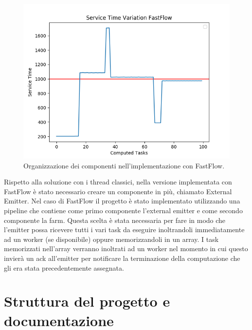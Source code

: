 \documentclass[12pt]{report}
\begin{document}
\begin{figure}[H]
\centering
  \includegraphics[width=0.7\linewidth]{FastFlow.png}
  \caption{Organizzazione dei componenti nell'implementazione con FastFlow.}
  \label{FastFlowComponents}
\end{figure} 
Rispetto alla soluzione con i thread classici, nella versione implementata con FastFlow è stato necessario creare un componente in più, chiamato External Emitter.
Nel caso di FastFlow il progetto è stato implementato utilizzando una pipeline che contiene come primo componente l'external emitter e come secondo componente la farm.
Questa scelta è stata necessaria per fare in modo che l'emitter possa ricevere tutti i vari task da eseguire inoltrandoli immediatamente ad un worker (se disponibile) oppure memorizzandoli in un array.
I task memorizzati nell'array verranno inoltrati ad un worker nel momento in cui questo invierà un ack all'emitter per notificare la terminazione della computazione che gli era stata precedentemente assegnata.

\chapter{Struttura del progetto e documentazione}
\end{document}
